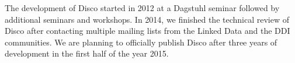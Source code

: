 \documentclass{llncs}
\begin{document}

The development of Disco started in 2012 at a Dagstuhl seminar followed by additional seminars and workshops.  
In 2014, we finished the technical review of Disco after contacting multiple mailing lists from the Linked Data and the DDI communities. 
We are planning to officially publish Disco after three years of development in the first half of the year 2015. 
\end{document}
